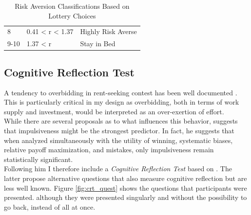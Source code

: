 \begin{table}[]
\begin{tabular}{lll}
    8                                                                 & 0.41 < r < 1.37                                                           & Highly Risk Averse                                                        \\
    9-10                                                              & 1.37 < r                                                                  & Stay in Bed\\
    \hline
    \end{tabular}
    \caption{Risk Aversion Classifications Based on Lottery Choices\\ \citep{holt2002}}
    \label{table:HL}
    \end{table}
    
    \subsection{Cognitive Reflection Test}
    \label{ss:CRT}
    
    A tendency to overbidding in rent-seeking contest has been well documented \citep{sheremeta2013, dechenaux2015}. This is particularly critical in my design as overbidding, both in terms of work supply and investment, would be interpreted as an over-exertion of effort.\\
     
    While there are several proposals as to what influences this behavior, \cite{sheremeta2016} suggests that impulsiveness might be the strongest predictor. In fact, he suggests that when analyzed simultaneously with the utility of winning, systematic biases, relative payoff maximization, and mistakes, only impulsiveness remain statistically significant.\\
    
    Following him I therefore include a \textit{Cognitive Reflection Test} based on \cite{thomson2016}. The latter propose alternative questions that also measure cognitive reflection but are less well known. Figure \ref{fig:crt_quest} shows the questions that participants were presented. although they were presented singularly and without the possibility to go back, instead of all at once.
    
